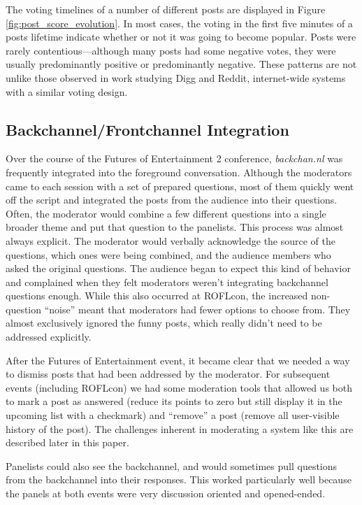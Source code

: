 The voting timelines of a number of different posts are displayed in Figure \ref{fig:post_score_evolution}. In most cases, the voting in the first five minutes of a posts lifetime indicate whether or not it was going to become popular. Posts were rarely contentious—although many posts had some negative votes, they were usually predominantly positive or predominantly negative. These patterns are not unlike those observed in work studying Digg and Reddit, internet-wide systems with a similar voting design. \citep{Lerman:2006wq}


\subsection{Backchannel/Frontchannel Integration}
Over the course of the Futures of Entertainment 2 conference, \emph{backchan.nl} was frequently integrated into the foreground conversation. Although the moderators came to each session with a set of prepared questions, most of them quickly went off the script and integrated the posts from the audience into their questions. Often, the moderator would combine a few different questions into a single broader theme and put that question to the panelists. This process was almost always explicit. The moderator would verbally acknowledge the source of the questions, which ones were being combined, and the audience members who asked the original questions. The audience began to expect this kind of behavior and complained when they felt moderators weren't integrating backchannel questions enough. While this also occurred at ROFLcon, the increased non-question ``noise'' meant that moderators had fewer options to choose from. They almost exclusively ignored the funny posts, which really didn't need to be addressed explicitly.

After the Futures of Entertainment event, it became clear that we needed a way to dismiss posts that had been addressed by the moderator. For subsequent events (including ROFLcon) we had some moderation tools that allowed us both to mark a post as answered (reduce its points to zero but still display it in the upcoming list with a checkmark) and ``remove'' a post (remove all user-visible history of the post). The challenges inherent in moderating a system like this are described later in this paper.

Panelists could also see the backchannel, and would sometimes pull questions from the backchannel into their responses. This worked particularly well because the panels at both events were very discussion oriented and opened-ended.

